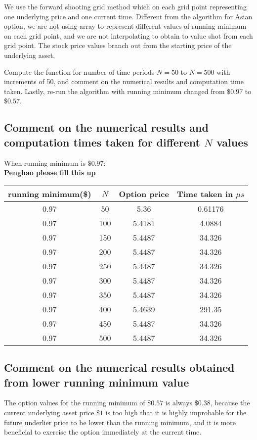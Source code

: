We use the forward shooting grid method which on each grid point representing one underlying price and one current time. Different from the algorithm for Asian option, we are not using array to represent different values of running minimum on each grid point, and we are not interpolating to obtain to value shot from each grid point. The stock price values branch out from the starting price of the underlying asset.

Compute the function for number of time periods $N = 50$ to $N = 500$ with increments of 50, and comment on the numerical results and computation time taken. Lastly, re-run the algorithm with running minimum changed from $\$0.97$ to $\$0.57$.

\subsection{Comment on the numerical results and computation times taken for different $N$ values}

\hspace{23mm} When running minimum is $\$0.97$: \\
\textbf{Penghao please fill this up}
\begin{center}
	\begin{tabular}{| c | c | c | c |}
		\hline running minimum(\$) & $N$ & Option price & Time taken in $\mu s$\\
		[0.5ex]
		\hline 0.97 & 50 & 5.36 & 0.61176 \\
		\hline 0.97 & 100 & 5.4181 & 4.0884 \\
		\hline 0.97 & 150 & 5.4487 & 34.326 \\
		\hline 0.97 & 200 & 5.4487 & 34.326 \\
		\hline 0.97 & 250 & 5.4487 & 34.326 \\
		\hline 0.97 & 300 & 5.4487 & 34.326 \\
		\hline 0.97 & 350 & 5.4487 & 34.326 \\
		\hline 0.97 & 400 & 5.4639 & 291.35 \\
		\hline 0.97 & 450 & 5.4487 & 34.326 \\
		\hline 0.97 & 500 & 5.4487 & 34.326 \\
		\hline
	\end{tabular}
\end{center}

\subsection{Comment on the numerical results obtained from lower running minimum value}
The option values for the running minimum of $\$0.57$ is always $\$0.38$, because the current underlying asset price $\$1$ is too high that it is highly improbable for the future underlier price to be lower than the running minimum, and it is more beneficial to exercise the option immediately at the current time.

